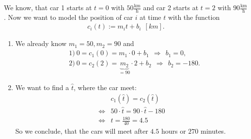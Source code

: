 {\color{solution}
We know, that car 1 starts at $t=0$ with $50\frac{\text{km}}{\text{h}}$ and car 2 starts at $t=2$ with $90\frac{\text{km}}{\text{h}}$. 
Now we want to model the position of car $i$ at time $t$ with the function
\begin{align*}
c_i(t):=m_i t +b_i~~[km].
\end{align*}
\begin{enumerate}
	\item 
	We already know $m_1= 50, m_2= 90$ and\begin{align*}
	& 1)~0=c_1(0)=m_1\cdot 0+b_1~~\Rightarrow~~b_1=0,\\
	& 2)~0=c_2(2)=\underbrace{m_2}_{=90}\cdot 2+b_2~~\Rightarrow~~b_2=-180.
	\end{align*}
	\item 
	We want to find a $\hat{t}$, where the car meet:
	\begin{align*}
	&c_1(\hat{t})=c_2(\hat{t})\\
	\Leftrightarrow &50\cdot\hat{t}=90\cdot\hat{t}-180\\
	\Leftrightarrow &\hat{t}=\frac{180}{40}=4.5
	\end{align*}
	So we conclude, that the cars will meet after $4.5$ hours or $270$ minutes.
\end{enumerate}
}